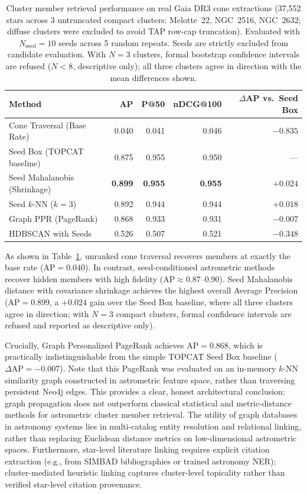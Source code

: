 \documentclass[12pt]{elsarticle}
\begin{document}
\begin{table}[htbp]
\centering
\caption{Cluster member retrieval performance on real Gaia DR3 cone extractions (37{,}552 stars across 3 untruncated compact clusters: Melotte~22, NGC~2516, NGC~2632; diffuse clusters were excluded to avoid TAP row-cap truncation). Evaluated with $N_{\mathrm{seed}}=10$ seeds across 5 random repeats. Seeds are strictly excluded from candidate evaluation. With $N=3$ clusters, formal bootstrap confidence intervals are refused ($N < 8$, descriptive only); all three clusters agree in direction with the mean differences shown.}
\label{tab:cluster_retrieval}
\begin{tabular}{lrrrr}
\toprule
\textbf{Method} & \textbf{AP} & \textbf{P@50} & \textbf{nDCG@100} & \textbf{$\Delta$AP vs.\ Seed Box} \\
\midrule
Cone Traversal (Base Rate)  & 0.040 & 0.041 & 0.046 & $-0.835$ \\
Seed Box (TOPCAT baseline)  & 0.875 & 0.955 & 0.950 & --- \\
Seed Mahalanobis (Shrinkage)& \textbf{0.899} & \textbf{0.955} & \textbf{0.955} & $+0.024$ \\
Seed $k$-NN ($k=3$)          & 0.892 & 0.944 & 0.944 & $+0.018$ \\
Graph PPR (PageRank)        & 0.868 & 0.933 & 0.931 & $-0.007$ \\
HDBSCAN with Seeds          & 0.526 & 0.507 & 0.521 & $-0.348$ \\
\bottomrule
\end{tabular}
\end{table}

As shown in Table~\ref{tab:cluster_retrieval}, unranked cone traversal recovers members at exactly the base rate ($\text{AP} = 0.040$). In contrast, seed-conditioned astrometric methods recover hidden members with high fidelity ($\text{AP} \approx 0.87$--$0.90$). Seed Mahalanobis distance with covariance shrinkage achieves the highest overall Average Precision ($\text{AP} = 0.899$, a $+0.024$ gain over the Seed Box baseline, where all three clusters agree in direction; with $N=3$ compact clusters, formal confidence intervals are refused and reported as descriptive only). 

Crucially, Graph Personalized PageRank achieves $\text{AP} = 0.868$, which is practically indistinguishable from the simple TOPCAT Seed Box baseline ($\Delta\text{AP} = -0.007$). Note that this PageRank was evaluated on an in-memory $k$-NN similarity graph constructed in astrometric feature space, rather than traversing persistent Neo4j edges. This provides a clear, honest architectural conclusion: graph propagation does not outperform classical statistical and metric-distance methods for astrometric cluster member retrieval. The utility of graph databases in astronomy systems lies in multi-catalog entity resolution and relational linking, rather than replacing Euclidean distance metrics on low-dimensional astrometric spaces. Furthermore, star-level literature linking requires explicit citation extraction (e.g., from SIMBAD bibliographies or trained astronomy NER); cluster-mediated heuristic linking captures cluster-level topicality rather than verified star-level citation provenance.
\end{document}
